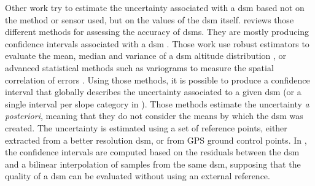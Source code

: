 Other work try to estimate the uncertainty associated with a \acrshort{dsm} based not on the method or sensor used, but on the values of the \acrshort{dsm} itself. \cite{mesa-mingorance_accuracy_2020} reviews those different methods for assessing the accuracy of \acrshort{dsm}s. They are mostly producing confidence intervals associated with a \acrshort{dsm} \cite{oksanen_digital_2006,panagiotakis_validation_2018,deschamps-berger_apport_2021}. Those work use robust estimators to evaluate the mean, median and variance of a \acrshort{dsm} altitude distribution \cite{wang_robust_2015}, or advanced statistical methods such as variograms to measure the spatial correlation of errors \cite{hugonnet_uncertainty_2022}. Using those methods, it is possible to produce a confidence interval that globally describes the uncertainty associated to a given \acrshort{dsm} (or a single interval per slope category in \cite{hugonnet_uncertainty_2022}). Those methods estimate the uncertainty \textit{a posteriori}, meaning that they do not consider the means by which the \acrshort{dsm} was created. The uncertainty is estimated using a set of reference points, either extracted from a better resolution \acrshort{dsm}, or from GPS ground control points. In \cite{wang_robust_2015}, the confidence intervals are computed based on the residuals between the \acrshort{dsm} and a bilinear interpolation of samples from the same \acrshort{dsm}, supposing that the quality of a \acrshort{dsm} can be evaluated without using an external reference. 

